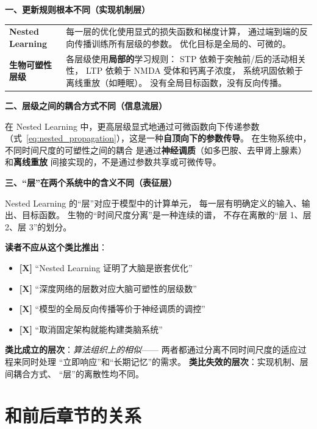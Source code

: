 \begin{analogyboundarybox}[title=这个类比在哪里失效]

\textbf{一、更新规则根本不同（实现机制层）}

\begin{tabular}{p{5cm} p{8cm}}
\textbf{Nested Learning}
& 每一层的优化使用显式的损失函数和梯度计算，
  通过端到端的反向传播训练所有层级的参数。
  优化目标是全局的、可微的。 \\
\textbf{生物可塑性层级}
& 各层级使用\textbf{局部的}学习规则：
  STP 依赖于突触前/后的活动相关性，
  LTP 依赖于 NMDA 受体和钙离子浓度，
  系统巩固依赖于离线重放（如睡眠）。
  没有全局目标函数，没有反向传播。 \\
\end{tabular}

\medskip\textbf{二、层级之间的耦合方式不同（信息流层）}

在 Nested Learning 中，更高层级显式地通过可微函数向下传递参数
（式~\eqref{eq:nested_propagation}），这是一种\textbf{自顶向下的参数传导}。
在生物系统中，不同时间尺度的可塑性之间的耦合
是通过\textbf{神经调质}（如多巴胺、去甲肾上腺素）和\textbf{离线重放}
间接实现的，不是通过参数共享或可微传导。

\medskip\textbf{三、``层''在两个系统中的含义不同（表征层）}

Nested Learning 的``层''对应于模型中的计算单元，
每一层有明确定义的输入、输出、目标函数。
生物的``时间尺度分离''是一种连续的谱，
不存在离散的``层 1、层 2、层 3''的划分。

\medskip\textbf{读者不应从这个类比推出}：
\begin{itemize}
  \item \textbf{[X]} ``Nested Learning 证明了大脑是嵌套优化''
  \item \textbf{[X]} ``深度网络的层数对应大脑可塑性的层级数''
  \item \textbf{[X]} ``模型的全局反向传播等价于神经调质的调控''
  \item \textbf{[X]} ``取消固定架构就能构建类脑系统''
\end{itemize}

\medskip
\textbf{类比成立的层次}：\textit{算法组织上的相似}——
两者都通过分离不同时间尺度的适应过程来同时处理
``立即响应''和``长期记忆''的需求。
\textbf{类比失效的层次}：实现机制、层间耦合方式、
``层''的离散性均不同。

\end{analogyboundarybox}

\section{和前后章节的关系}
\label{sec:nested_bridges}


